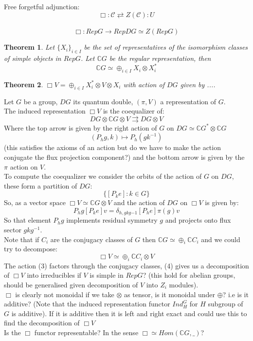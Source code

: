 \documentclass{article}
\newtheorem{theorem}{Theorem}
\begin{document}
Free forgetful adjunction:
$$\Box: \mathcal{C} \rightleftarrows Z(\mathcal{C}):U$$ \\


$$\Box: RepG \rightarrow RepDG\simeq Z(RepG)$$
\begin{theorem}
	Let $\{X_i\}_{i\in I}$ be the set of representatives of the isomorphism classes of simple objects in $RepG$. Let $\mathbb{C}G$ be the regular representation, then $$\mathbb{C}G \simeq \oplus_{i\in I}X_i\otimes X_i^*$$
\end{theorem}
\begin{theorem}
	$\Box V = \oplus_{i\in I}X_i^*\otimes V \otimes X_i$ with action of $DG$ given by ....
\end{theorem}
Let $G$ be a group, $DG$ its quantum double, $(\pi,V)$ a representation of $G$. \\
The induced representation $\Box V$ is the coequalizer of: \\
$$DG \otimes \mathbb{C}G \otimes V \rightrightarrows DG\otimes V$$ 
Where the top arrow is given by the right action of $G$ on $DG \simeq \mathbb{C}G^* \otimes \mathbb{C}G$ 
$$ (P_hg, k) \mapsto P_h (gk^{-1})$$
(this satisfies the axioms of an action but do we have to make the action conjugate the flux projection component?) and the bottom arrow is given by the $\pi$ action on $V$. \\
To compute the coequalizer we consider the orbits of the action of $G$ on $DG$, these form a partition of $DG$:
$$ \{[P_ke] : k \in G\} $$
So, as a vector space $\Box V \simeq \mathbb{C}G \otimes V$ and the action of $DG$ on $\Box V$ is given by:
\begin{equation}
P_hg [P_ke]v = \delta_{h,gkg{-1}} [P_he] \pi(g)v
\end{equation} 
So that element $P_hg$ implements residual symmetry $g$ and projects onto flux sector $gkg^{-1}$. \\
Note that if $C_i$ are the conjugacy classes of $G$ then $\mathbb{C}G \simeq \oplus_i \mathbb{C}C_i$ and we could try to decompose:
\begin{equation}
\Box V \simeq \oplus_i \mathbb{C}C_i \otimes V
\end{equation}
The action (3) factors through the conjugacy classes, (4) gives us a decomposition of $ \Box V$ into irreducibles if $V$ is simple in $RepG$? (this hold for abelian groups, should be generalised given decomposition of $V$ into $Z_i$ modules). \\
$\Box$ is clearly not monoidal if we take $\otimes$ as tensor, is it monoidal under $\oplus$? i.e is it additive? (Note that the induced representation functor $Ind_H^G$ for $H$ subgroup of $G$ is additive). If it is additive then it is left and right exact and could use this to find the decomposition of $ \Box V$ \\
Is the $\Box$ functor representable? In the sense $\Box \simeq Hom(\mathbb{C}G,\_)$?
\end{document}
